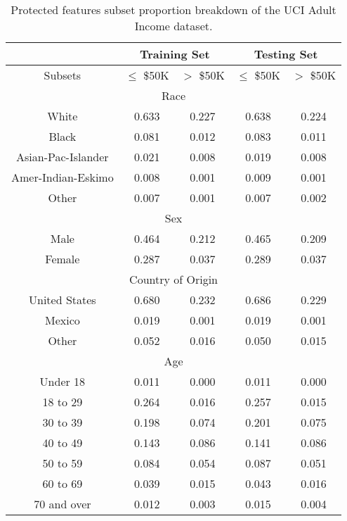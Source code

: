 \begin{table}[!ht]
  \centering
  \begin{tabular}{|c|c|c||c|c|}
  \cline{2-5}
  \multicolumn{1}{c|}{} & \multicolumn{2}{c||}{Training Set} & \multicolumn{2}{c|}{Testing Set} \\
  \hline 
  Subsets & $\leq$ \$50K & $>$ \$50K & $\leq$ \$50K & $>$ \$50K \\ 
  \hline
  
  
  \multicolumn{5}{|c|}{Race} \\
  \hline 
  White & 0.633 & 0.227 & 0.638 & 0.224 \\ 
  \hline 
  Black & 0.081 & 0.012 & 0.083 & 0.011 \\ 
  \hline 
  Asian-Pac-Islander  & 0.021 & 0.008 & 0.019 & 0.008 \\ 
  \hline 
  Amer-Indian-Eskimo & 0.008 & 0.001 & 0.009 & 0.001 \\ 
  \hline 
  Other & 0.007 & 0.001 & 0.007 & 0.002 \\ 
  \hline
  
  
  \multicolumn{5}{|c|}{Sex} \\
  \hline 
  Male  & 0.464 & 0.212 & 0.465 & 0.209 \\ 
  \hline 
  Female & 0.287 & 0.037 & 0.289 & 0.037 \\ 
  \hline 
  
  
  \multicolumn{5}{|c|}{Country of Origin} \\
  \hline 
  United States & 0.680 & 0.232 & 0.686 & 0.229 \\ 
  \hline 
  Mexico & 0.019 & 0.001 & 0.019 & 0.001 \\ 
  \hline 
  Other & 0.052 & 0.016 & 0.050 & 0.015 \\ 
  \hline
  
  
  \multicolumn{5}{|c|}{Age} \\
  \hline 
  Under 18 & 0.011 & 0.000 & 0.011 & 0.000 \\ 
  \hline 
  18 to 29 & 0.264 & 0.016 & 0.257 & 0.015 \\ 
  \hline 
  30 to 39 & 0.198 & 0.074 & 0.201 & 0.075 \\ 
  \hline 
  40 to 49 & 0.143 & 0.086 & 0.141 & 0.086 \\ 
  \hline 
  50 to 59 & 0.084 & 0.054 & 0.087 & 0.051 \\ 
  \hline 
  60 to 69 & 0.039 & 0.015 & 0.043 & 0.016 \\ 
  \hline 
  70 and over & 0.012 & 0.003 & 0.015 & 0.004 \\ 
  \hline 
  \end{tabular} 
  
  \caption{Protected features subset proportion breakdown of the UCI Adult Income dataset.}
   \label{tab:protected-features-subset-breakdown}
\end{table}
